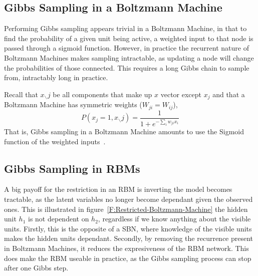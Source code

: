 \subsection{Gibbs Sampling in a Boltzmann Machine}

Performing Gibbs sampling appears trivial in a Boltzmann Machine, in that to find the probability of a given unit being active, a weighted input to that node is passed through a sigmoid function. However, in practice the recurrent nature of Boltzmann Machines makes sampling intractable, as updating a node will change the probabilities of those connected. This requires a long Gibbs chain to sample from, intractably long in practice.

Recall that $ x_{\smallsetminus} j$ be all components that make up $x$ vector except $x_j$ and that a Boltzmann Machine has symmetric weights ($ W_{ji} = W_{ij} $),
$$
P(x_j = 1, x_{\smallsetminus}j) = \frac{1}{1 + e^{-\sum_i w_{ji}x_i}}
$$
That is, Gibbs sampling in a Boltzmann Machine amounts to use the Sigmoid function of the weighted inputs~\cite{neal1992:connectionist}.

\subsection{Gibbs Sampling in RBMs}\label{S:Gibbs-Sampling-RBM}



A big payoff for the restriction in an RBM is inverting the model becomes tractable, as the latent variables no longer become dependant given the observed ones. This is illustrated in figure~\ref{F:Restricted-Boltzmann-Machine} the hidden unit $h_1$ is not dependent on $h_2$, regardless if we know anything about the visible units. Firstly, this is the opposite of a SBN, where knowledge of the visible units makes the hidden units dependant. Secondly, by removing the recurrence present in Boltzmann Machines, it reduces the expresiveness of the RBM network. This does make the RBM useable in practice, as the Gibbs sampling process can stop after one Gibbs step\cite{fischer2014training}.

